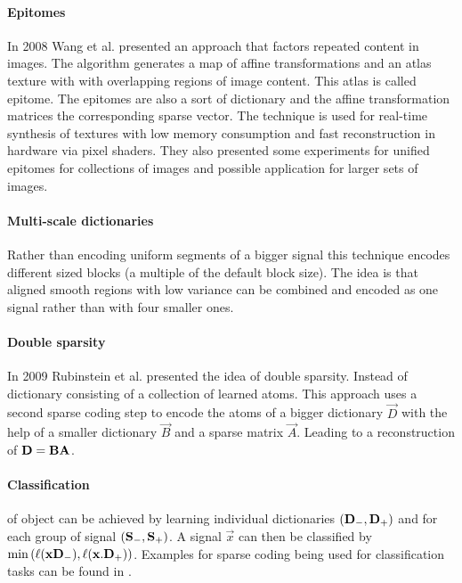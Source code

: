 \paragraph{Epitomes} In 2008 Wang et al.\cite{Wang2008a} presented
an approach that factors repeated content in images. The algorithm generates 
a map of affine transformations and an atlas texture with with overlapping
regions of image content. This atlas is called epitome. The epitomes are also a
sort of dictionary and the affine transformation matrices 
the corresponding sparse vector. The technique is used for real-time synthesis
of textures with low memory consumption and  fast reconstruction in hardware via
pixel shaders. They also presented some experiments for unified epitomes for
collections of images and possible application for larger sets of images. 

\paragraph{Multi-scale dictionaries}
Rather than encoding uniform segments of a bigger signal this technique
encodes different sized blocks (a multiple of the default block size). The
idea is that aligned smooth regions with low variance can be combined
and encoded as one signal rather than with four smaller ones.\cite{Mairal2007}

\paragraph{Double sparsity}
In 2009 Rubinstein et al.\cite{Rubinstein2009} presented the idea of double
sparsity. Instead of dictionary consisting  of a collection of
learned atoms. This approach uses a second sparse coding step to encode
the atoms of a bigger dictionary $\vec{D}$ with the help of a smaller
dictionary $\vec{B}$ and a sparse matrix $\vec{A}$. Leading to a reconstruction
of $\boldsymbol{\mathrm{D}}=\boldsymbol{\mathrm{B}}\boldsymbol{\mathrm{A}}$. 

\paragraph{Classification} of object can be achieved by learning
individual dictionaries $(\boldsymbol{\mathrm{D}}_{-},\boldsymbol{\mathrm{D}}_{+})$ and for each group of
signal $(\boldsymbol{\mathrm{S}}_{-},\boldsymbol{\mathrm{S}}_{+})$. A signal $\vec{x}$ can then be classified
by $\min \left( \ell(\boldsymbol{\mathrm{x}}\boldsymbol{\mathrm{D}}_{-}),\ell(\boldsymbol{\mathrm{x}}.\boldsymbol{\mathrm{D}}_{+}) \right)$.
Examples for sparse coding being used for classification tasks can be found in
\cite{Grosse2007,Mairal2008,Mairal2008b,Bar2009}.

